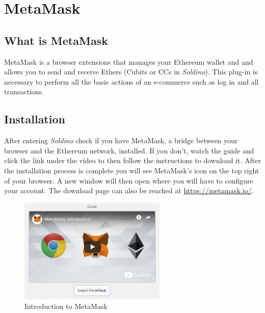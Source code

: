 \section{MetaMask}
	\subsection{What is MetaMask}
	MetaMask is a browser extensions that manages your Ethereum wallet and 
	and allows you to send and receive Ethers (Cubits or CCs in \textit{Soldino}). 
	This plug-in is necessary to perform all the basic actions of an 
	e-commerce such as log in and all transactions. 
	\subsection{Installation}
	After entering \textit{Soldino} check if you have MetaMask, a bridge between 
	your browser and the Ethereum network, installed.
	If you don't, watch the guide and click the link under the video to then 
	follow the instructions to download it. After the installation process is 
	complete you will see MetaMask's icon on the top right of your browser. A 
	new window will then open where you will have to configure your account.
	The download page can also be reached at \url{https://metamask.io/}.
	\newline
	\begin{figure}[H]
		\includegraphics[width=7cm]{res/images/MetaMask_download.png}
		\centering
		\caption{Introduction to MetaMask}
	\end{figure}
